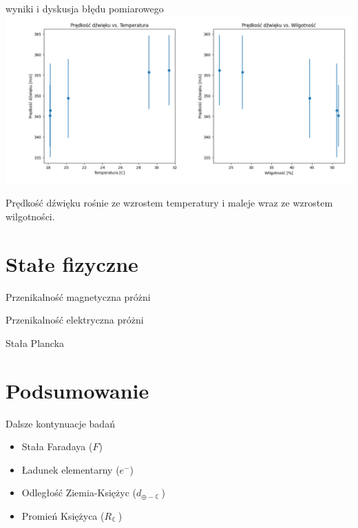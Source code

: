\documentclass{beamer}
\begin{document}
\begin{frame}{wyniki i dyskusja błędu pomiarowego}
\includegraphics[width=\linewidth]{temp_humid_mach.png}

Prędkość dźwięku rośnie ze wzrostem temperatury i maleje wraz ze wzrostem wilgotności.
\end{frame}


\section{Stałe fizyczne}

\begin{frame}{Przenikalność magnetyczna próżni}

\end{frame}

\begin{frame}{Przenikalność elektryczna próżni}

\end{frame}

\begin{frame}{Stała Plancka}

\end{frame}


\section{Podsumowanie}

\begin{frame}{Dalsze kontynuacje badań}
\begin{itemize}
\item Stała Faradaya ($F$)
\item Ładunek elementarny ($e^-$)
\item Odległość Ziemia-Księżyc ($d_{\oplus - \leftmoon}$)
\item Promień Księżyca ($R_{\leftmoon}$)
\end{itemize}

\end{frame}
\end{document}
